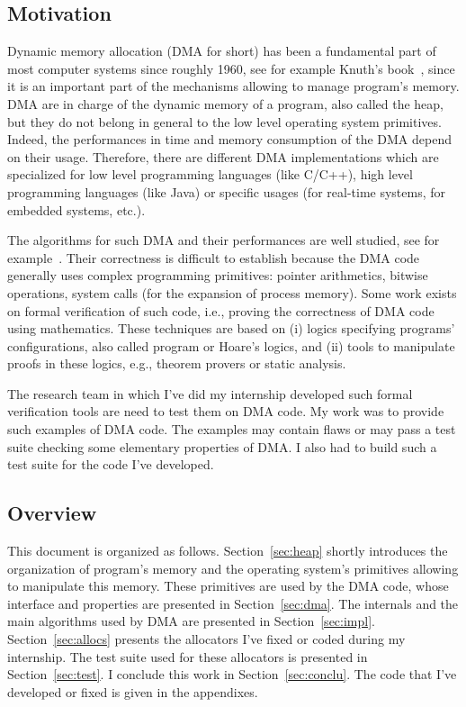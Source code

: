 \subsection{Motivation}

Dynamic memory allocation (DMA for short) has been a fundamental part of most computer systems since roughly 1960,
see for example Knuth's book~\cite{Knuth73a},
since it is an important part of the mechanisms allowing to manage program's memory.
DMA are in charge of the dynamic memory of a program, also called the heap, but they do not belong in general to the low level operating system primitives. Indeed, the performances in time and memory consumption of the DMA depend on their usage.
Therefore, there are different DMA implementations which are specialized for low level programming languages (like C/C++), high level programming languages (like Java) or specific usages (for real-time systems, for embedded systems, etc.).

The algorithms for such DMA and their performances are well studied, see for example~\cite{Knuth73a,WilsonJNB95}.
Their correctness is difficult to establish because the DMA code generally uses complex programming primitives: pointer arithmetics, bitwise operations, system calls (for the expansion of process memory). 
Some work exists on formal verification of such code, i.e., proving the correctness of DMA code using mathematics. These techniques are based on (i) logics specifying programs' configurations, also called program or Hoare's logics,
and (ii) tools to manipulate proofs in these logics, e.g., theorem provers or static analysis.

The research team in which I've did my internship developed such formal verification tools are need to test them on DMA code. My work was to provide such examples of DMA code. The examples may contain flaws or may pass a test suite checking some elementary properties of DMA. I also had to build such a test suite for the code I've developed.

\subsection{Overview}

This document is organized as follows.
Section~\ref{sec:heap} shortly introduces the organization of program's memory and the operating system's primitives allowing to manipulate this memory.
These primitives are used by the DMA code, whose interface and properties are presented in Section~\ref{sec:dma}.
The internals and the main algorithms used by DMA are presented in Section~\ref{sec:impl}.
Section~\ref{sec:allocs} presents the allocators I've fixed or coded during my internship.
The test suite used for these allocators is presented in Section~\ref{sec:test}.
I conclude this work in Section~\ref{sec:conclu}.
The code that I've developed or fixed is given in the appendixes.
